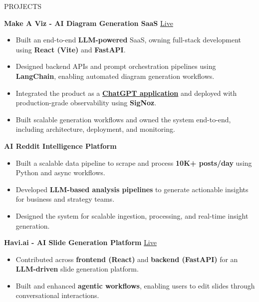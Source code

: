 \documentclass{resume}
\begin{document}
\begin{rSection}{PROJECTS}

\textbf{Make A Viz - AI Diagram Generation SaaS} \hfill \href{https://makeaviz.com/}{Live} 
\begin{itemize}
    \item Built an end-to-end \textbf{LLM-powered} SaaS, owning full-stack development using \textbf{React (Vite)} and \textbf{FastAPI}.
    
    \item Designed backend APIs and prompt orchestration pipelines using \textbf{LangChain}, enabling automated diagram generation workflows.
    
    \item Integrated the product as a \href{https://chatgpt.com/apps/make-a-viz/asdk_app_69463c3af6a48191aef5c21055cd32bf}{\textbf{ChatGPT application}} and deployed with production-grade observability using \textbf{SigNoz}.
    
    \item Built scalable generation workflows and owned the system end-to-end, including architecture, deployment, and monitoring.

\end{itemize}


\textbf{AI Reddit Intelligence Platform}
\begin{itemize}
    \item Built a scalable data pipeline to scrape and process \textbf{10K+ posts/day} using Python and async workflows.
    
    \item Developed \textbf{LLM-based analysis pipelines} to generate actionable insights for business and strategy teams.
    
    \item Designed the system for scalable ingestion, processing, and real-time insight generation.

\end{itemize}


\textbf{Havi.ai - AI Slide Generation Platform} \hfill \href{https://www.havi.ai/}{Live}
\begin{itemize}
    \item Contributed across \textbf{frontend (React)} and \textbf{backend (FastAPI)} for an \textbf{LLM-driven} slide generation platform.
    
    \item Built and enhanced \textbf{agentic workflows}, enabling users to edit slides through conversational interactions.
    

\end{itemize}
\end{rSection}
\end{document}
